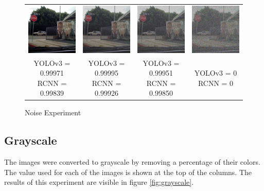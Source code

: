 \documentclass{article}
\begin{document}
\begin{figure}[h]
\begin{tabular}{ c c c c }
    \includegraphics[width=0.2\linewidth]{../test_images/stop3.png} & \includegraphics[width=0.2\linewidth]{../test_images/perturbed/stop3_noise_100.png} & \includegraphics[width=0.2\linewidth]{../test_images/perturbed/stop3_noise_200.png} & \includegraphics[width=0.2\linewidth]{../test_images/perturbed/stop3_noise_500.png} \\
    \makecell{YOLOv3 = 0.99971 \\ RCNN = 0.99839} & \makecell{YOLOv3 = 0.99995 \\ RCNN = 0.99926} & \makecell{YOLOv3 = 0.99951 \\ RCNN = 0.99850} & \makecell{YOLOv3 = 0 \\ RCNN = 0} \\  
\end{tabular}
\label{fig:randnoise}
\caption{Noise Experiment}
\end{figure}

\subsection{Grayscale}
The images were converted to grayscale by removing a percentage of their colors. The value used for each of the images is shown at the top of the columns. The results of this experiment are visible in figure \ref{fig:grayscale}.
\end{document}
